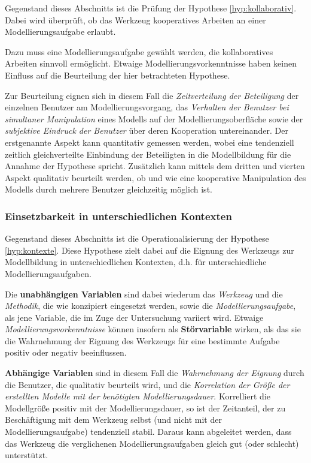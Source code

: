 Gegenstand dieses Abschnitts ist die Prüfung der Hypothese \ref{hyp:kollaborativ}. Dabei wird überprüft, ob das Werkzeug kooperatives Arbeiten an einer Modellierungsaufgabe erlaubt.

Dazu muss eine Modellierungsaufgabe gewählt werden, die kollaboratives Arbeiten sinnvoll ermöglicht. Etwaige Modellierungsvorkenntnisse haben keinen Einfluss auf die Beurteilung der hier betrachteten Hypothese.

Zur Beurteilung eignen sich in diesem Fall die \emph{Zeitverteilung der Beteiligung} der einzelnen Benutzer am Modellierungsvorgang, das \emph{Verhalten der Benutzer bei simultaner Manipulation} eines Modells auf der Modellierungsoberfläche sowie der \emph{subjektive Eindruck der Benutzer} über deren Kooperation untereinander. Der erstgenannte Aspekt kann quantitativ gemessen werden, wobei eine tendenziell zeitlich gleichverteilte Einbindung der Beteiligten in die Modellbildung für die Annahme der Hypothese spricht. Zusätzlich kann mittels dem dritten und vierten Aspekt qualitativ beurteilt werden, ob und wie eine kooperative Manipulation des Modells durch mehrere Benutzer gleichzeitig möglich ist.


\subsubsection{Einsetzbarkeit in unterschiedlichen Kontexten} %
\label{ssub:einsetzbarkeit_in_unterschiedlichen_kontexten}

Gegenstand dieses Abschnitts ist die Operationalisierung der Hypothese \ref{hyp:kontexte}. Diese Hypothese zielt dabei auf die Eignung des Werkzeugs zur Modellbildung in unterschiedlichen Kontexten, d.h. für unterschiedliche Modellierungsaufgaben. 

Die \textbf{unabhängigen Variablen} sind dabei wiederum das \emph{Werkzeug} und die \emph{Methodik}, die wie konzipiert eingesetzt werden, sowie die \emph{Modellierungsaufgabe}, als jene Variable, die im Zuge der Untersuchung variiert wird. Etwaige \emph{Modellierungsvorkenntnisse} können insofern als \textbf{Störvariable} wirken, als das sie die Wahrnehmung der Eignung des Werkzeugs für eine bestimmte Aufgabe positiv oder negativ beeinflussen.

\textbf{Abhängige Variablen} sind in diesem Fall die \emph{Wahrnehmung der Eignung} durch die Benutzer, die qualitativ beurteilt wird, und die \emph{Korrelation der Größe der erstellten Modelle mit der benötigten Modellierungsdauer}. Korrelliert die Modellgröße positiv mit der Modellierungsdauer, so ist der Zeitanteil, der zu Beschäftigung mit dem Werkzeug selbst (und nicht mit der Modellierungsaufgabe) tendenziell stabil. Daraus kann abgeleitet werden, dass das Werkzeug die verglichenen Modellierungsaufgaben gleich gut (oder schlecht) unterstützt.

